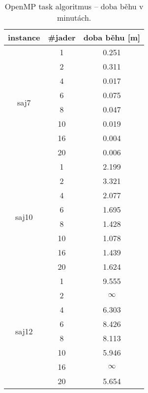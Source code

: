 \documentclass{article}
\begin{document}
    \begin{table}[h]
        \centering
        \begin{tabular}{|c|c|c|}
            \hline
            \multicolumn{1}{|l|}{\textbf{instance}} & \multicolumn{1}{l|}{\textbf{\#jader}} & \textbf{doba běhu} {[}m{]} \\ \hline
            \multirow{8}{*}{saj7}  & 1  & 0.251 \\
            & 2  & 0.311 \\
            & 4  & 0.017 \\
            & 6  & 0.075 \\
            & 8  & 0.047 \\
            & 10 & 0.019 \\
            & 16 & 0.004 \\
            & 20 & 0.006 \\ \hline
            \multirow{8}{*}{saj10} & 1  & 2.199 \\
            & 2  & 3.321 \\
            & 4  & 2.077 \\
            & 6  & 1.695 \\
            & 8  & 1.428 \\
            & 10 & 1.078 \\
            & 16 & 1.439 \\
            & 20 & 1.624 \\ \hline
            \multirow{8}{*}{saj12} & 1  & 9.555 \\
            & 2  & $\infty$   \\
            & 4  & 6.303 \\
            & 6  & 8.426 \\
            & 8  & 8.113 \\
            & 10 & 5.946 \\
            & 16 & $\infty$   \\
            & 20 & 5.654 \\ \hline
        \end{tabular}
        \caption{OpenMP task algoritmus -- doba běhu v minutách.}
        \label{tab:openmp-task}
    \end{table}
\end{document}
